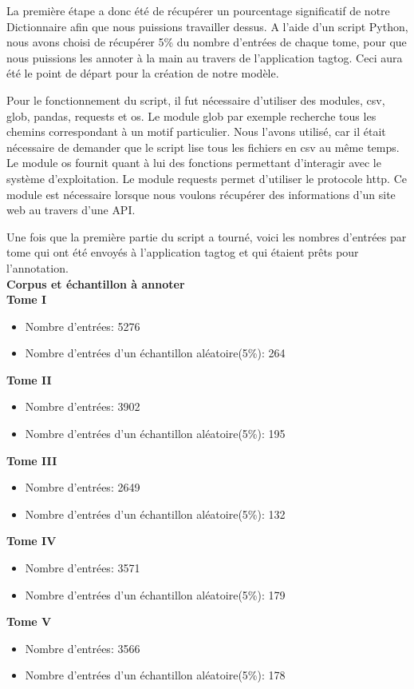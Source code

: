 \documentclass[a4paper,12pt,twoside]{book}
\begin{document}
La première étape a donc été de récupérer un pourcentage significatif de notre Dictionnaire afin que nous puissions travailler dessus. A l’aide d’un script Python, nous avons choisi de récupérer 5\% du nombre d’entrées de chaque tome, pour que nous puissions les annoter à la main au travers de l’application tagtog. Ceci aura été le point de départ pour la création de notre modèle. 

Pour le fonctionnement du script, il fut nécessaire d’utiliser des modules, csv, glob, pandas, requests et os. Le module glob par exemple recherche tous les chemins correspondant à un motif particulier. Nous l’avons utilisé, car il était nécessaire de demander que le script lise tous les fichiers en csv au même temps. Le module os fournit quant à lui des fonctions permettant d’interagir avec le système d’exploitation. Le module requests permet d’utiliser le protocole http. Ce module est nécessaire lorsque nous voulons récupérer des informations d’un site web au travers d’une \Gls{API}.
	
Une fois que la première partie du script a tourné, voici les nombres d’entrées par tome qui ont été envoyés à l’application tagtog et qui étaient prêts pour l’annotation.\\
	
	\textbf{Corpus et échantillon à annoter}\\

 \noindent \textbf{Tome I}
\begin{itemize}
\item Nombre d'entrées: 5276
\item Nombre d'entrées d'un échantillon aléatoire(5\%): 264 \\
\end{itemize}
\textbf{Tome II}
\begin{itemize}
\item Nombre d'entrées: 3902
\item Nombre d'entrées d'un échantillon aléatoire(5\%): 195\\
\end{itemize}
\textbf{Tome III}
\begin{itemize}
\item Nombre d'entrées: 2649
\item Nombre d'entrées d'un échantillon aléatoire(5\%): 132 \\
\end{itemize}
\textbf{Tome IV}
\begin{itemize}
\item Nombre d'entrées: 3571
\item Nombre d'entrées d'un échantillon aléatoire(5\%): 179 \\

\end{itemize}
\textbf{Tome V}
\begin{itemize}
\item Nombre d'entrées: 3566
\item Nombre d'entrées d'un échantillon aléatoire(5\%): 178 \\
\end{itemize}
\end{document}
